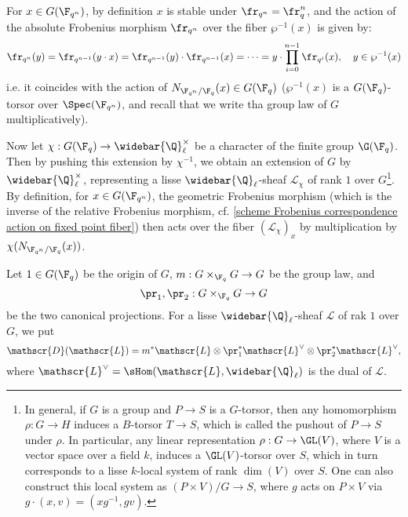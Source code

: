 For $x\in G(\F_{q^n})$, by definition $x$ is stable under $\fr_{q^n}=\fr_q^n$, and the action of the absolute Frobenius morphism $\fr_{q^n}$ over the fiber $\wp^{-1}(x)$ is given by:
\[\fr_{q^n}(y)=\fr_{q^{n-1}}(y\cdot x)=\fr_{q^{n-1}}(y)\cdot\fr_{q^{n-1}}(x)=\cdots=y\cdot\prod_{i=0}^{n-1}\fr_{q^i}(x),\quad y\in\wp^{-1}(x)\]
i.e. it coincides with the action of $N_{\F_{q^n}/\F_q}(x)\in G(\F_q)$ ($\wp^{-1}(x)$ is a $G(\F_q)$-torsor over $\Spec(\F_{q^n})$, and recall that we write tha group law of $G$ multiplicatively).\par
Now let $\chi:G(\F_q)\to\widebar{\Q}_\ell^\times$ be a character of the finite group $\G(\F_q)$. Then by pushing this extension by $\chi^{-1}$, we obtain an extension of $G$ by $\widebar{\Q}_\ell^\times$, representing a lisse $\widebar{\Q}_\ell$-sheaf $\mathscr{L}_\chi$ of rank $1$ over $G$\footnote{In general, if $G$ is a group and $P\to S$ is a $G$-torsor, then any homomorphism $\rho:G\to H$ induces a $B$-torsor $T\to S$, which is called the pushout of $P\to S$ under $\rho$. In particular, any linear representation $\rho:G\to\GL(V)$, where $V$ is a vector space over a field $k$, induces a $\GL(V)$-torsor over $S$, which in turn corresponds to a lisse $k$-local system of rank $\dim(V)$ over $S$. One can also construct this local system as $(P\times V)/G\to S$, where $g$ acts on $P\times V$ via $g\cdot(x,v)=(xg^{-1},gv)$.}. By definition, for $x\in G(\F_{q^n})$, the geometric Frobenius morphism (which is the inverse of the relative Frobenius morphism, cf. \cref{scheme Frobenius correspondence action on fixed point fiber}) then acts over the fiber $(\mathscr{L}_{\chi})_x$ by multiplication by $\chi(N_{\F_{q^n}/\F_q}(x))$.\par
Let $1\in G(\F_q)$ be the origin of $G$, $m:G\times_{\F_q}G\to G$ be the group law, and
\[\pr_1,\pr_2:G\times_{\F_q}G\to G\]
be the two canonical projections. For a lisse $\widebar{\Q}_\ell$-sheaf $\mathscr{L}$ of rak $1$ over $G$, we put
\[\mathscr{D}(\mathscr{L})=m^*\mathscr{L}\otimes\pr_1^*\mathscr{L}^\vee\otimes\pr_2^*\mathscr{L}^\vee,\]
where $\mathscr{L}^\vee=\sHom(\mathscr{L},\widebar{\Q}_\ell)$ is the dual of $\mathscr{L}$. 

